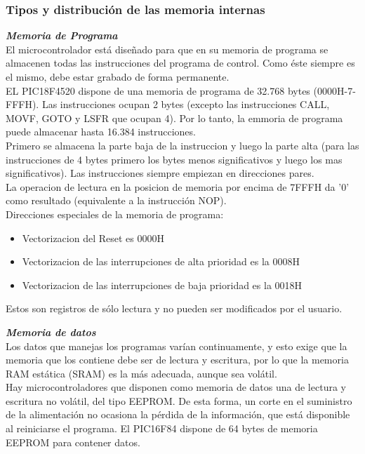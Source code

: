 \documentclass[12pt,a4paper]{article}
\begin{document}
   \subsubsection{Tipos y distribución de las memoria internas}
   \textbf{\textit{Memoria de Programa}}\\
   El microcontrolador está diseñado para que en su memoria de programa se almacenen todas las instrucciones del programa de control. Como éste siempre es el mismo, debe estar grabado de forma permanente. \\
   EL PIC18F4520 dispone de una memoria de programa de 32.768 bytes (0000H-7-FFFH). Las instrucciones ocupan 2 bytes (excepto las instrucciones CALL, MOVF, GOTO y LSFR que ocupan 4). Por lo tanto, la emmoria de programa puede almacenar hasta 16.384 instrucciones. \\
   Primero se almacena la parte baja de la instruccion y luego la parte alta (para las instrucciones de 4 bytes primero los bytes menos significativos y luego los mas significativos). Las instrucciones siempre empiezan en direcciones pares.\\
   
  La operacion de lectura en la posicion de memoria por encima de 7FFFH da '0' como resultado (equivalente a la instrucción NOP).\\
   Direcciones especiales de la memoria de programa:
   \begin{itemize}
   		\item Vectorizacion del Reset es 0000H
   		\item Vectorizacion de las interrupciones de alta prioridad es la 0008H
   		\item Vectorizacion de las interrupciones de baja prioridad es la 0018H
   \end{itemize}
   Estos son registros de sólo lectura y no pueden ser modificados por el usuario\cite{CCS}.
   
   \textbf{\textit{Memoria de datos}}\\
   Los datos que manejas los programas varían continuamente, y esto exige que la memoria que los contiene debe ser de lectura y escritura, por lo que la memoria RAM estática (SRAM) es la más adecuada, aunque sea volátil.\\
Hay microcontroladores que disponen como memoria de datos una de lectura y escritura no volátil, del tipo EEPROM. De esta forma, un corte en el suministro de la alimentación no ocasiona la pérdida de la información, que está disponible al reiniciarse el programa. El PIC16F84 dispone de 64 bytes de memoria EEPROM para contener datos.
\end{document}
